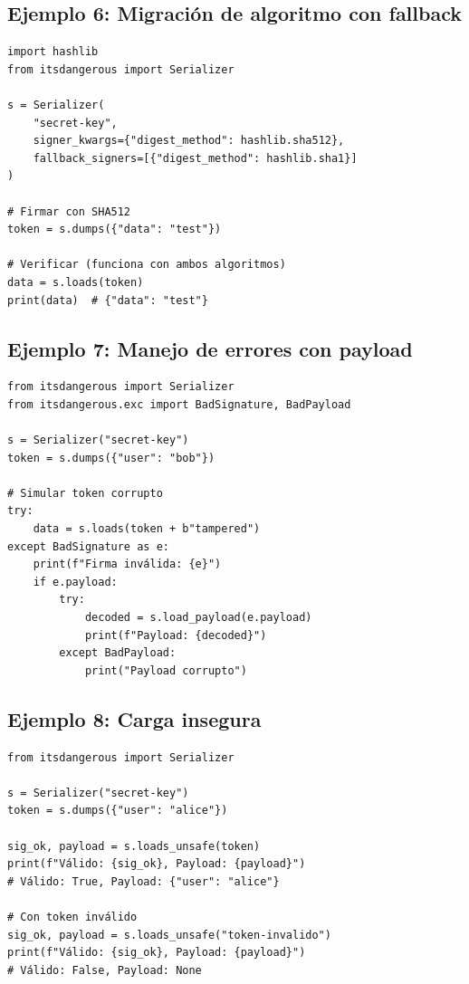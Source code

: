 \documentclass[11pt,a4paper]{article}
\begin{document}
\subsection*{Ejemplo 6: Migración de algoritmo con fallback}


\begin{lstlisting}
import hashlib
from itsdangerous import Serializer

s = Serializer(
    "secret-key",
    signer_kwargs={"digest_method": hashlib.sha512},
    fallback_signers=[{"digest_method": hashlib.sha1}]
)

# Firmar con SHA512
token = s.dumps({"data": "test"})

# Verificar (funciona con ambos algoritmos)
data = s.loads(token)
print(data)  # {"data": "test"}
\end{lstlisting}


\subsection*{Ejemplo 7: Manejo de errores con payload}


\begin{lstlisting}
from itsdangerous import Serializer
from itsdangerous.exc import BadSignature, BadPayload

s = Serializer("secret-key")
token = s.dumps({"user": "bob"})

# Simular token corrupto
try:
    data = s.loads(token + b"tampered")
except BadSignature as e:
    print(f"Firma inválida: {e}")
    if e.payload:
        try:
            decoded = s.load_payload(e.payload)
            print(f"Payload: {decoded}")
        except BadPayload:
            print("Payload corrupto")
\end{lstlisting}


\subsection*{Ejemplo 8: Carga insegura}


\begin{lstlisting}
from itsdangerous import Serializer

s = Serializer("secret-key")
token = s.dumps({"user": "alice"})

sig_ok, payload = s.loads_unsafe(token)
print(f"Válido: {sig_ok}, Payload: {payload}")
# Válido: True, Payload: {"user": "alice"}

# Con token inválido
sig_ok, payload = s.loads_unsafe("token-invalido")
print(f"Válido: {sig_ok}, Payload: {payload}")
# Válido: False, Payload: None
\end{lstlisting}
\end{document}
